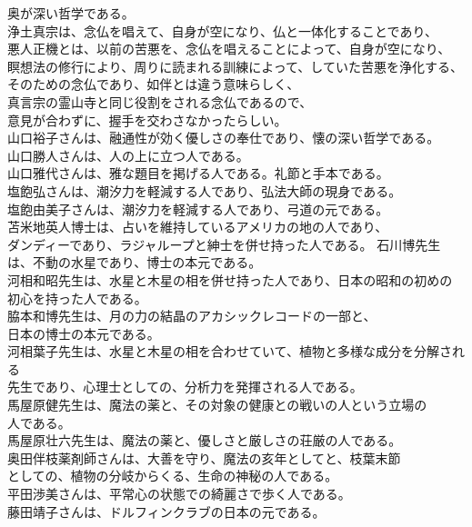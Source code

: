 \documentclass{jsarticle}
\begin{document}
奥が深い哲学である。\\
浄土真宗は、念仏を唱えて、自身が空になり、仏と一体化することであり、\\
悪人正機とは、以前の苦悪を、念仏を唱えることによって、自身が空になり、\\
瞑想法の修行により、周りに読まれる訓練によって、していた苦悪を浄化する、\\
そのための念仏であり、如伴とは違う意味らしく、\\
真言宗の霊山寺と同じ役割をされる念仏であるので、\\
意見が合わずに、握手を交わさなかったらしい。\\
山口裕子さんは、融通性が効く優しさの奉仕であり、懐の深い哲学である。\\
山口勝人さんは、人の上に立つ人である。\\
山口雅代さんは、雅な題目を掲げる人である。礼節と手本である。\\
塩飽弘さんは、潮汐力を軽減する人であり、弘法大師の現身である。\\
塩飽由美子さんは、潮汐力を軽減する人であり、弓道の元である。\\
苫米地英人博士は、占いを維持しているアメリカの地の人であり、\\
ダンディーであり、ラジャループと紳士を併せ持った人である。
石川博先生は、不動の水星であり、博士の本元である。\\
河相和昭先生は、水星と木星の相を併せ持った人であり、日本の昭和の初めの \\
初心を持った人である。 \\
脇本和博先生は、月の力の結晶のアカシックレコードの一部と、\\
日本の博士の本元である。\\
河相葉子先生は、水星と木星の相を合わせていて、植物と多様な成分を分解される \\
先生であり、心理士としての、分析力を発揮される人である。 \\
馬屋原健先生は、魔法の薬と、その対象の健康との戦いの人という立場の \\
人である。 \\
馬屋原壮六先生は、魔法の薬と、優しさと厳しさの荘厳の人である。 \\
奥田伴枝薬剤師さんは、大善を守り、魔法の亥年としてと、枝葉末節 \\
としての、植物の分岐からくる、生命の神秘の人である。 \\
平田渉美さんは、平常心の状態での綺麗さで歩く人である。\\
藤田靖子さんは、ドルフィンクラブの日本の元である。\\
\end{document}
